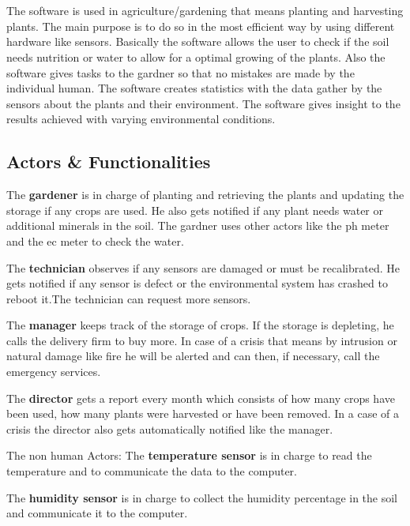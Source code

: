 \section{\mysystemname}

The software is used in agriculture/gardening that means planting and harvesting
plants. The main purpose is to do so in the most efficient way by using
different hardware like sensors. Basically the software allows the user to check
if the soil needs nutrition or water to allow for a optimal growing of the
plants. Also the software gives tasks to the gardner so that no mistakes are
made by the individual human. The software creates statistics with the data
gather by the sensors about the plants and their environment. The software gives
insight to the results achieved with varying environmental conditions.


\subsection{Actors \& Functionalities}

The \textbf{gardener} is in charge of planting and retrieving the plants and
updating the storage if any crops are used. He also gets notified if any plant
needs water or additional minerals in the soil. The gardner uses other actors
like the ph meter and the ec meter to check the water.\break

\noindent The \textbf{technician} observes if any sensors are damaged or must be
recalibrated. He gets notified if any sensor is defect or the environmental
system has crashed to reboot it.The technician can request more sensors.\break

\noindent The \textbf{manager} keeps track of the storage of crops. If the
storage is depleting, he calls the delivery firm to buy more. In case of a crisis that
means by intrusion or natural damage like fire he will be alerted and can then,
if necessary, call the emergency services.\break

\noindent The \textbf{director} gets a report every month which consists of how
many crops have been used, how many plants were harvested or have been removed. In a case
of a crisis the director also gets automatically notified like the
manager.\break

\noindent The non human Actors:\hfill \break
The \textbf{temperature sensor} is in charge to read the temperature and to
communicate the data to the computer.

\noindent The \textbf{humidity sensor} is in charge to collect the humidity
percentage in the soil and communicate it to the computer.


